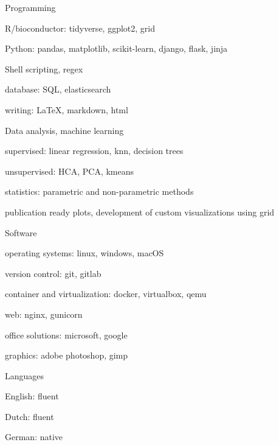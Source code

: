 

\begin{cvskills}
  \cvskill
    {Programming} %
    {
      \begin{cvitems}
        \item {R/bioconductor: tidyverse, ggplot2, grid}
        \item {Python: pandas, matplotlib, scikit-learn, django, flask, jinja}
        \item {Shell scripting, regex}
        \item {database: SQL, elasticsearch}
        \item {writing: LaTeX, markdown, html}
      \end{cvitems}
      }
      
  \cvskill
    {Data analysis, machine learning}%
    {
      \begin{cvitems}
        \item {supervised: linear regression, knn, decision trees}
        \item {unsupervised: HCA, PCA, kmeans}
        \item {statistics: parametric and non-parametric methods}
        \item {publication ready plots, development of custom visualizations using grid}
      \end{cvitems}
    }
  \cvskill
    {Software}%
    {
      \begin{cvitems}
        \item {operating systems: linux, windows, macOS}
        \item {version control: git, gitlab}
        \item {container and virtualization: docker, virtualbox, qemu}
        \item {web: nginx, gunicorn}
        \item {office solutions: microsoft, google}
        \item {graphics: adobe photoshop, gimp}
      \end{cvitems}
    }
  \cvskill
    {Languages} %
    {
      \begin{cvitems}
        \item English: fluent
        \item Dutch: fluent
        \item German: native
      \end{cvitems}
    }
\end{cvskills}

